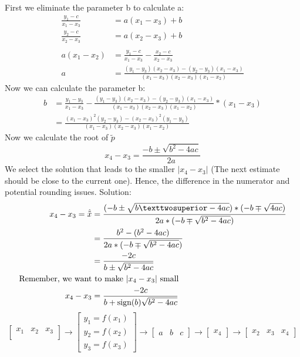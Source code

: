 First we eliminate the parameter b to calculate a:
\begin{align*}
    \frac{y_1-c}{x_1-x_3}&=a(x_1-x_3)+b\\
    \frac{y_2-c}{x_2-x_3}&=a(x_2-x_3)+b\\
    \\
    a(x_1-x_2)&=\frac{y_1-c}{x_1-x_3}-\frac{x_2-c}{x_2-x_3}\\
    a&=\frac{(y_1-y_3)(x_2-x_3)-(y_2-y_3)(x_1-x_3)}{(x_1-x_3)(x_2-x_3)(x_1-x_2)}
\end{align*}
Now we can calculate the parameter b:
\begin{align*}
    b &= \frac{y_1-y_3}{x_1-x_3}-\frac{(y_1-y_3)(x_2-x_3)-(y_2-y_3)(x_1-x_3)}
    {(x_1-x_3)(x_2-x_3)(x_1-x_2)}*(x_1-x_3)\\
    &=\frac{(x_1-x_3)^2(y_2-y_3)-(x_2-x_3)^2(y_1-y_3)}{(x_1-x_3)(x_2-x_3)(x_1-x_2)}
\end{align*}
Now we calculate the root of $\tilde{p}$
\begin{equation*}
    x_4-x_3=\frac{-b \pm \sqrt{b^2-4ac}}{2a}
\end{equation*}
We select the solution that leads to the smaller $\lvert x_4- x_3 \rvert$ (The next estimate should be close to the current one).
Hence, the difference in the numerator and potential rounding issues.
Solution:
\begin{align*}
    x_4-x_3 = \hat{\tilde{x}} &= \cfrac{(-b \pm \sqrt {b²-4ac})*(-b \mp \sqrt{4ac})}{2a*(-b \mp \sqrt {b^2-4ac})}\\
    &=\frac{b^2-(b^2-4ac)}{2a*(-b \mp \sqrt{b^2-4ac})}\\
    &=\frac{-2c}{b \pm \sqrt {b^2-4ac}}\\
    \text{Remember, we want} &\text{ to make $\lvert x_4-x_3 \rvert$ small}\\
    x_4-x_3&= \frac{-2c}{b+\text{sign}(b)\sqrt {b^2-4ac}}
\end{align*}
\begin{equation*}
    \begin{bmatrix}
        x_1 &x_2 &x_3\\
    \end{bmatrix}
    \to
    \begin{bmatrix*}
        y_1=f(x_1)\\
        y_2=f(x_2)\\
        y_3=f(x_3)
    \end{bmatrix*}
    \to
    \begin{bmatrix*}
        a &b &c
    \end{bmatrix*}
    \to
    \begin{bmatrix*}
        x_4
    \end{bmatrix*}
    \to
    \begin{bmatrix*}
        x_2 &x_3 &x_4
    \end{bmatrix*}
\end{equation*}

